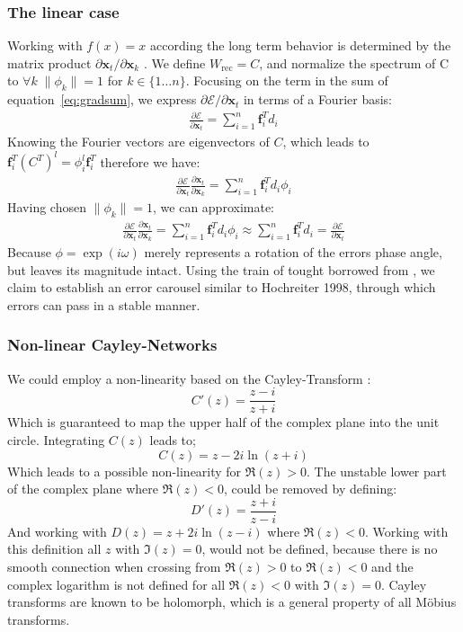 \documentclass{article}
\begin{document}
\subsubsection{The linear case}
Working with $f(x) = x$ according the long term behavior is determined by the matrix product $\partial \mathbf{x}_t / \partial \mathbf{x}_k$ \cite{Pascanu}. We define $W_{\text{rec}} = C$, and normalize the spectrum of C to $\forall k \; \| \phi_k \| = 1$ for $k \in \{1 \dots n\}$. Focusing on the term in the sum of equation~\ref{eq:gradsum}, we express $\partial \mathcal{E} / \partial \mathbf{x}_t $ in terms of a Fourier basis:
\begin{align}
\frac{\partial \mathcal{E}}{\partial \mathbf{x}_t} = \sum_{i=1}^n \mathbf{f}_i^T d_i  
\end{align}
Knowing the Fourier vectors are eigenvectors of $C$, which leads to $\mathbf{f}_i^T(C^T)^l = \phi_i^l\mathbf{f}_i^T$ therefore we have:
\begin{align}
\frac{\partial \mathcal{E}}{\partial \mathbf{x}_t}\frac{\partial \mathbf{x}_t}{\partial \mathbf{x}_k} = 
\sum_{i=1}^n \mathbf{f}_i^T d_i \phi_i 
\end{align}
Having chosen $\| \phi_k \| = 1$, we can approximate:
\begin{align}
\frac{\partial \mathcal{E}}{\partial \mathbf{x}_t}\frac{\partial \mathbf{x}_t}{\partial \mathbf{x}_k} = 
\sum_{i=1}^n \mathbf{f}_i^T d_i \phi_i 
\approx \sum_{i=1}^n \mathbf{f}_i^T d_i =\frac{\partial \mathcal{E}}{\partial \mathbf{x}_t}
\end{align}
Because $\phi = \exp(i\omega)$ merely represents a rotation of the errors phase angle, but leaves its magnitude intact.
Using the train of tought borrowed from \cite{Pascanu}, we claim to establish an error carousel similar to Hochreiter 1998, through which errors can pass in a stable manner.

\subsubsection{Non-linear Cayley-Networks}
We could employ a non-linearity based on the Cayley-Transform \cite[p. 100]{Bornemann}:
\begin{equation}
C'(z) = \frac{z-i}{z+i}
\end{equation}
Which is guaranteed to map the upper half of the complex plane into the unit circle. Integrating $C(z)$
leads to;
\begin{equation}
C(z) = z - 2i\ln(z + i)
\end{equation}
Which leads to a possible non-linearity for $\Re(z) > 0$. The unstable lower part of the complex plane where $\Re(z) < 0$, could be removed by defining:
\begin{equation}
D'(z) = \frac{z+i}{z-i}
\end{equation}
And working with $D(z) = z + 2i\ln(z - i)$ where  $\Re(z) < 0$. Working with this definition all $z$ with $\Im(z) = 0$, would not be defined, because there is no smooth connection when crossing from $\Re(z) > 0$ to $\Re(z) < 0$ and the complex logarithm is not defined for all $\Re(z) < 0$ with $\Im(z) = 0$.
Cayley transforms are known to be holomorph, which is a general property of all Möbius transforms.
\end{document}

